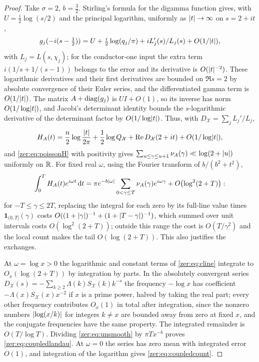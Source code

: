 \begin{proof}
Take $\sigma=2$, $b=\tfrac32$. Stirling's formula for the digamma function gives, with
$U=\tfrac i2\log(s/2)$ and the principal logarithm, uniformly as $\lvert t\rvert\to\infty$ on $s=2+it$,
\[
 g_j(-i(s-\tfrac12))=U+\tfrac i2\log(q_j/\pi)+iL_j'(s)/L_j(s)+O(1/\lvert t\rvert),
\]
with $L_j=L(s,\chi_j)$; for the conductor-one input the extra term $i(1/s+1/(s-1))$ belongs to the error
and its derivative is $O(\lvert t\rvert^{-2})$. These logarithmic derivatives and their first derivatives are
bounded on $\Re s=2$ by absolute convergence of their Euler series, and the differentiated gamma term is
$O(1/\lvert t\rvert)$. The matrix $A+\operatorname{diag}(g_j)$ is $UI+O(1)$, so its inverse has norm $O(1/\log\lvert t\rvert)$, and
Jacobi's determinant identity bounds the $s$-logarithmic derivative of the determinant factor by
$O(1/\log\lvert t\rvert)$. Thus, with $D_{\mathcal X}=\sum_jL_j'/L_j$,
\begin{equation}\label{zer:eq:cline}
 H_A(t)=\frac n2\log\frac{\lvert t\rvert}{2\pi}+\frac12\log Q_{\mathcal X}+\operatorname{Re} D_{\mathcal X}(2+it)+O(1/\log\lvert t\rvert),
\end{equation}
and \eqref{zer:eq:poissonH} with positivity gives $\sum_{u\le\gamma\le u+1}\nu_A(\gamma)\ll\log(2+\lvert u\rvert)$
uniformly on $\mathbb{R}$. For fixed real $\omega$, using the Fourier transform of $b/(b^2+t^2)$,
\begin{equation}\label{zer:eq:unsmooth}
 \int_0^TH_A(t)e^{i\omega t}\,\mathrm{d} t=\pi e^{-b\lvert\omega\rvert}\sum_{0<\gamma\le T}\nu_A(\gamma)e^{i\omega\gamma}+O\bigl(\log^2(2+T)\bigr):
\end{equation}
for $-T\le\gamma\le2T$, replacing the integral for each zero by its full-line value times
$\mathbf 1_{(0,T]}(\gamma)$ costs $O((1+\lvert\gamma\rvert)^{-1}+(1+\lvert T-\gamma\rvert)^{-1})$, which summed over unit
intervals costs $O(\log^2(2+T))$; outside this range the cost is $O(T/\gamma^2)$ and the local count makes
the tail $O(\log(2+T))$. This also justifies the exchanges.

At $\omega=\log x>0$ the logarithmic and constant terms of \eqref{zer:eq:cline} integrate to
$O_x(\log(2+T))$ by integration by parts. In the absolutely convergent series
$D_{\mathcal X}(s)=-\sum_{k\ge2}\Lambda(k)S_{\mathcal X}(k)k^{-s}$ the frequency $-\log x$ has coefficient
$-\Lambda(x)S_{\mathcal X}(x)x^{-2}$ if $x$ is a prime power, halved by taking the real part; every other
frequency contributes $O_x(1)$ in total after integration, since the nonzero numbers $\lvert\log(x/k)\rvert$
for integers $k\ne x$ are bounded away from zero at fixed $x$, and the conjugate frequencies have the same
property. The integrated remainder is $O(T/\log T)$. Dividing \eqref{zer:eq:unsmooth} by $\pi Tx^{-b}$
proves \eqref{zer:eq:coupledlandau}. At $\omega=0$ the series has zero mean with integrated error $O(1)$,
and integration of the logarithm gives \eqref{zer:eq:coupledcount}.
\end{proof}

